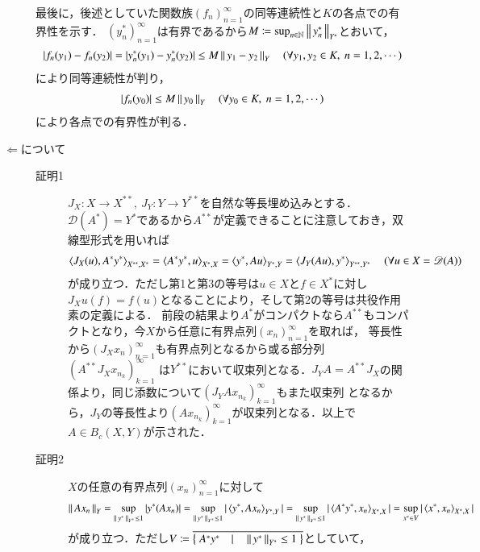 \begin{prf}
\begin{description}
				最後に，後述としていた関数族$(f_n)_{n=1}^{\infty}$の同等連続性と$K$の各点での有界性を示す．
				$(y_n^*)_{n=1}^{\infty}$は有界であるから$M \coloneqq \operatorname*{sup}_{n\in\mathbb{N}} \left\|\, y_n^*\, \right\|_{Y^*}$とおいて，
				\begin{align}
					|f_n(y_1) - f_n(y_2)| = |y_n^*(y_1) - y_n^*(y_2)| \leq M\left\|\, y_1 - y_2\, \right\|_{Y} \quad (\forall y_1,y_2 \in K,\ n=1,2,\cdots)
				\end{align}
				により同等連続性が判り，
				\begin{align}
					|f_n(y_0)| \leq M \left\|\, y_0\, \right\|_{Y} \quad (\forall y_0 \in K,\ n=1,2,\cdots)
				\end{align}
				により各点での有界性が判る．
			
			\item[$\Leftarrow$について]\mbox{}
				\begin{description}
					\item[証明1]
						$J_X:X \longrightarrow X^{**},\ J_Y:Y \longrightarrow Y^{**}$を自然な等長埋め込みとする．
						$\mathscr{D}(A^*)=Y^*$であるから$A^{**}$が定義できることに注意しておき，双線型形式を用いれば
						\begin{align}
							\inprod<J_X(u),A^*y^*>_{X^{**},X^*} = \inprod<A^*y^*,u>_{X^{*},X} = \inprod<y^*,Au>_{Y^{*},Y} = \inprod<J_Y(Au),y^*>_{Y^{**},Y^*} \quad (\forall u \in X=\mathscr{D}(A))
						\end{align}
						が成り立つ．ただし第1と第3の等号は$u \in X$と$f \in X^*$に対し$J_Xu(f)=f(u)$となることにより，そして第2の等号は共役作用素の定義による．
						前段の結果より$A^*$がコンパクトなら$A^{**}$もコンパクトとなり，今$X$から任意に有界点列$(x_n)_{n=1}^{\infty}$を取れば，
						等長性から$\left(J_Xx_n\right)_{n=1}^{\infty}$も有界点列となるから或る部分列$\left(A^{**}J_Xx_{n_k}\right)_{k=1}^{\infty}$
						は$Y^{**}$において収束列となる．$J_YA = A^{**}J_X$の関係より，同じ添数について$\left(J_YAx_{n_k}\right)_{k=1}^{\infty}$もまた収束列
						となるから，$J_Y$の等長性より$\left(Ax_{n_k}\right)_{k=1}^{\infty}$が収束列となる．以上で$A \in B_c(X,Y)$が示された．
					\item[証明2]
						$X$の任意の有界点列$(x_n)_{n=1}^{\infty}$に対して
						\begin{align}
							\Norm{Ax_n}{Y} = \sup{\Norm{y^*}{Y^*} \leq 1}{|y^*(Ax_n)|}
							= \sup{\Norm{y^*}{Y^*} \leq 1}{|\inprod<y^*,Ax_n>_{Y^*,Y}|}
							= \sup{\Norm{y^*}{Y^*} \leq 1}{|\inprod<A^*y^*,x_n>_{X^*,X}|}
							= \sup{x^* \in V}{|\inprod<x^*,x_n>_{X^*,X}|}
						\end{align}
						が成り立つ．ただし$V \coloneqq \closure{\left\{\ A^*y^*\quad |\quad \Norm{y^*}{Y^*} \leq 1\ \right\}}$としていて，

\end{description}
\end{description}
\end{prf}

